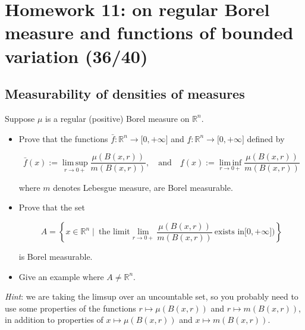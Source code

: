 \chapter{Homework 11: on regular Borel measure and functions of bounded variation (36/40)}\label{homework-11-on-regular-borel-measure-and-functions-of-bounded-variation-3640}

\section{Measurability of densities of measures}\label{measurability-of-densities-of-measures}

Suppose \(\mu\) is a regular (positive) Borel measure on \(\mathbb{R}^{n}\).

\begin{itemize}
\item
  Prove that the functions \(\bar{f}:\mathbb{R}^{n}\rightarrow\lbrack 0, + \infty\rbrack\) and \(\underline{f}:\mathbb{R}^{n}\rightarrow\lbrack 0, + \infty\rbrack\) defined by

  \[\bar{f}(x) := \operatorname{lim\, sup}\limits_{r\rightarrow 0 +}\frac{\mu(B(x,r))}{m(B(x,r))},\quad\text{and}\quad\underline{f}(x) := \operatorname{lim\, inf}\limits_{r\rightarrow 0 +}\frac{\mu(B(x,r))}{m(B(x,r))}\]

  where \(m\) denotes Lebesgue measure, are Borel measurable.
\item
  Prove that the set

  \[A = \left\{ {x \in \mathbb{R}^{n} \mid \ \text{the limit}\lim\limits_{r\rightarrow 0 +}\frac{\mu(B(x,r))}{m(B(x,r))}\ \text{exists in}\lbrack 0, + \infty\rbrack\text{)}} \right\}\]

  is Borel measurable.
\item
  Give an example where \(A \neq \mathbb{R}^{n}\).
\end{itemize}

\emph{Hint}: we are taking the limsup over an uncountable set, so you probably need to use some properties of the functions \(r\mapsto\mu(B(x,r))\) and \(r\mapsto m(B(x,r))\), in addition to properties of \(x\mapsto\mu(B(x,r))\) and \(x\mapsto m(B(x,r))\).

